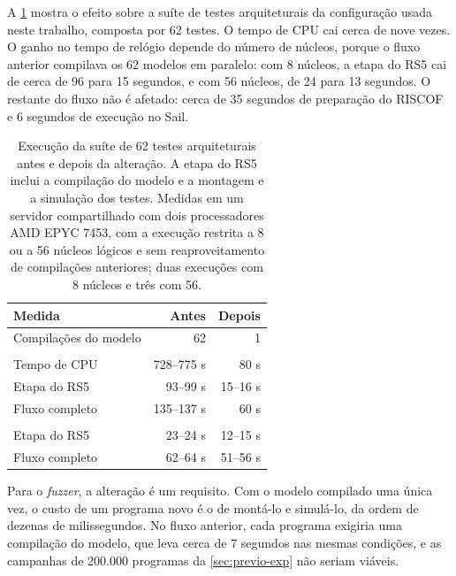 A \cref{tab:riscof-tempo} mostra o efeito sobre a suíte de testes arquiteturais da configuração usada neste trabalho, composta por 62 testes. O tempo de CPU cai cerca de nove vezes. O ganho no tempo de relógio depende do número de núcleos, porque o fluxo anterior compilava os 62 modelos em paralelo: com 8 núcleos, a etapa do RS5 cai de cerca de 96 para 15 segundos, e com 56 núcleos, de 24 para 13 segundos. O restante do fluxo não é afetado: cerca de 35 segundos de preparação do RISCOF e 6 segundos de execução no Sail.

\begin{table}[htbp]
    \centering
    \caption{Execução da suíte de 62 testes arquiteturais antes e depois da alteração. A etapa do RS5 inclui a compilação do modelo e a montagem e a simulação dos testes. Medidas em um servidor compartilhado com dois processadores AMD EPYC 7453, com a execução restrita a 8 ou a 56 núcleos lógicos e sem reaproveitamento de compilações anteriores; duas execuções com 8 núcleos e três com 56.}
    \label{tab:riscof-tempo}
    \small
    \setlength{\tabcolsep}{12pt}
    \renewcommand{\arraystretch}{1.2}
    \begin{tabular}{@{}lrr@{}}
        \toprule
        \textbf{Medida} & \textbf{Antes} & \textbf{Depois} \\
        \midrule
        Compilações do modelo & 62 & 1 \\
        \addlinespace
        \multicolumn{3}{@{}l}{\textit{8 núcleos lógicos}} \\
        \quad Tempo de CPU   & 728--775 s & 80 s \\
        \quad Etapa do RS5   & 93--99 s   & 15--16 s \\
        \quad Fluxo completo & 135--137 s & 60 s \\
        \addlinespace
        \multicolumn{3}{@{}l}{\textit{56 núcleos lógicos}} \\
        \quad Etapa do RS5   & 23--24 s   & 12--15 s \\
        \quad Fluxo completo & 62--64 s   & 51--56 s \\
        \bottomrule
    \end{tabular}
\end{table}

Para o \textit{fuzzer}, a alteração é um requisito. Com o modelo compilado uma única vez, o custo de um programa novo é o de montá-lo e simulá-lo, da ordem de dezenas de milissegundos. No fluxo anterior, cada programa exigiria uma compilação do modelo, que leva cerca de 7 segundos nas mesmas condições, e as campanhas de 200.000 programas da \cref{sec:previo-exp} não seriam viáveis.

